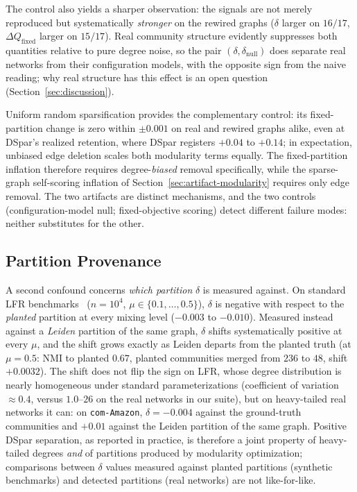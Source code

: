 \documentclass[10pt,journal,compsoc]{IEEEtran}
\begin{document}
The control also yields a sharper observation: the signals are not merely reproduced but systematically \emph{stronger} on the rewired graphs ($\delta$ larger on $16/17$, $\Delta Q_{\mathrm{fixed}}$ larger on $15/17$). Real community structure evidently suppresses both quantities relative to pure degree noise, so the pair $(\delta, \delta_{\mathrm{null}})$ does separate real networks from their configuration models, with the opposite sign from the naive reading; why real structure has this effect is an open question (Section~\ref{sec:discussion}).

Uniform random sparsification provides the complementary control: its fixed-partition change is zero within $\pm 0.001$ on real and rewired graphs alike, even at DSpar's realized retention, where DSpar registers $+0.04$ to $+0.14$; in expectation, unbiased edge deletion scales both modularity terms equally. The fixed-partition inflation therefore requires degree-\emph{biased} removal specifically, while the sparse-graph self-scoring inflation of Section~\ref{sec:artifact-modularity} requires only edge removal. The two artifacts are distinct mechanisms, and the two controls (configuration-model null; fixed-objective scoring) detect different failure modes: neither substitutes for the other.

\subsection{Partition Provenance}
\label{sec:mech-provenance}

A second confound concerns \emph{which partition} $\delta$ is measured against.
On standard LFR benchmarks~\cite{lancichinetti2008benchmark} ($n = 10^4$, $\mu \in \{0.1,\dots,0.5\}$), $\delta$ is negative with respect to the \emph{planted} partition at every mixing level ($-0.003$ to $-0.010$).
Measured instead against a \emph{Leiden} partition of the same graph, $\delta$ shifts systematically positive at every $\mu$, and the shift grows exactly as Leiden departs from the planted truth (at $\mu = 0.5$: NMI to planted $0.67$, planted communities merged from $236$ to $48$, shift $+0.0032$).
The shift does not flip the sign on LFR, whose degree distribution is nearly homogeneous under standard parameterizations (coefficient of variation $\approx 0.4$, versus $1.0$--$26$ on the real networks in our suite), but on heavy-tailed real networks it can: on \texttt{com-Amazon}, $\delta = -0.004$ against the ground-truth communities and $+0.01$ against the Leiden partition of the same graph.
Positive DSpar separation, as reported in practice, is therefore a joint property of heavy-tailed degrees \emph{and} of partitions produced by modularity optimization; comparisons between $\delta$ values measured against planted partitions (synthetic benchmarks) and detected partitions (real networks) are not like-for-like.
\end{document}
